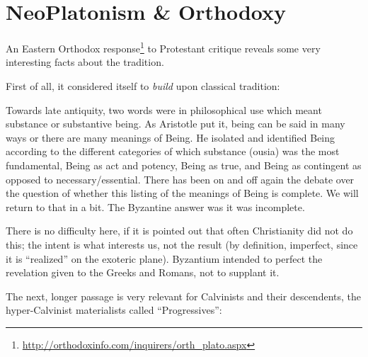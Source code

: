\section{NeoPlatonism \& Orthodoxy}

An Eastern Orthodox response\footnote{\url{http://orthodoxinfo.com/inquirers/orth\_plato.aspx}} to Protestant critique reveals some very interesting facts about the tradition.

First of all, it considered itself to \emph{build} upon classical tradition:

\begin{quotex}
Towards late antiquity, two words were in philosophical use which meant substance or substantive being. As Aristotle put it, being can be said in many ways or there are many meanings of Being. He isolated and identified Being according to the different categories of which substance (ousia) was the most fundamental, Being as act and potency, Being as true, and Being as contingent as opposed to necessary/essential. There has been on and off again the debate over the question of whether this listing of the meanings of Being is complete. We will return to that in a bit. The Byzantine answer was it was incomplete.
\end{quotex}


There is no difficulty here, if it is pointed out that often Christianity did not do this; the intent is what interests us, not the result (by definition, imperfect, since it is ``realized'' on the exoteric plane). Byzantium intended to perfect the revelation given to the Greeks and Romans, not to supplant it.

The next, longer passage is very relevant for Calvinists and their descendents, the hyper-Calvinist materialists called ``Progressives'':

